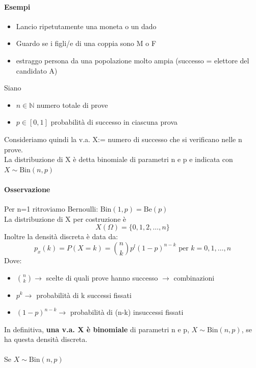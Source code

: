 \documentclass[12pt, a4paper, openany]{book}
\begin{document}
\paragraph*{Esempi} \begin{itemize}
    \item Lancio ripetutamente una moneta o un dado
    \item Guardo se i figli/e di una coppia sono M o F
    \item estraggo persona da una popolazione molto ampia (successo = elettore del candidato A)
\end{itemize}
Siano \begin{itemize}
    \item $n \in \mathbb{N}$ numero totale di prove
    \item $p \in [0,1]$ probabilità di successo in ciascuna prova
\end{itemize}
Consideriamo quindi la v.a. X:= numero di successo che si verificano nelle n prove.
\\ La distribuzione di X è detta binomiale di parametri n e p e indicata con $X \sim \text{Bin}(n,p)$
\paragraph*{Osservazione} Per n=1 ritroviamo Bernoulli: $\text{Bin}(1,p) = \text{Be}(p)$
\\ La distribuzione di X per costruzione è
\begin{equation*}
    X(\Omega) = \{0,1,2,\dots,n\}
\end{equation*}
Inoltre la densità discreta è data da:
\begin{equation*}
    p_x (k) = P(X=k) = \binom{n}{k}p^l (1-p)^{n-k} \text{ per } k = 0,1,\dots, n
\end{equation*}
Dove: \begin{itemize}
    \item $\binom{n}{k} \rightarrow$ scelte di quali prove hanno successo $\rightarrow$ combinazioni
    \item $p^k \rightarrow$ probabilità di k successi fissati
    \item $(1-p)^{n-k} \rightarrow$ probabilità di (n-k) insuccessi fissati
\end{itemize}

In definitiva, \textbf{una v.a. X è binomiale} di parametri n e p, $X \sim \text{Bin}(n,p)$,
se ha questa densità discreta.
\\
\\ Se $X \sim \text{Bin}(n,p)$
\end{document}

